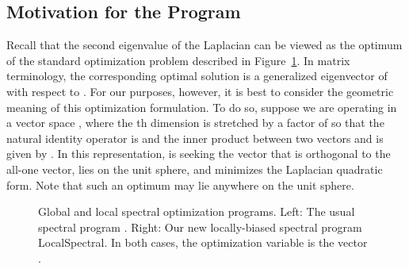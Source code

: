 \documentclass[11pt]{article}
\begin{document}
\subsection{Motivation for the Program}
\label{sxn:optimize-program}

Recall that the second eigenvalue  of the Laplacian  can 
be viewed as the optimum of the standard optimization problem 
 described in Figure~\ref{fig:spectral}. 
In matrix terminology, the corresponding optimal solution  is a 
generalized eigenvector of  with respect to . 
For our purposes, however, it is best to consider the geometric meaning of 
this optimization formulation. 
To do so, suppose we are operating in a vector space , where 
the th dimension is stretched by a factor of  so that the natural 
identity operator is  and the inner product between two vectors  and 
 is given by .
In this representation,  is seeking the vector 
 that is orthogonal to the all-one vector, lies on the 
unit sphere, and minimizes the Laplacian quadratic form. 
Note that such an optimum  may lie anywhere on the unit sphere.  

\begin{figure}
\begin{minipage}{0.5\textwidth}

\end{minipage}
\begin{minipage}{0.5\textwidth}

\end{minipage}
\caption{Global and local spectral optimization programs.
Left: The usual spectral program . 
Right: Our new locally-biased spectral program 
\textsf{LocalSpectral}.  
In both cases, the optimization variable is the vector .
}
\label{fig:spectral}
\end{figure}
\end{document}

